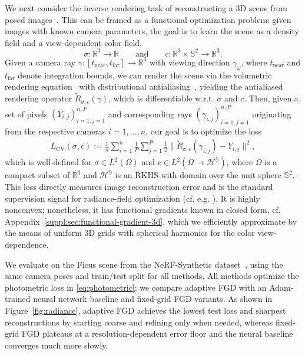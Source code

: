 \documentclass{article}
\newcommand{\R}{\mathbb{R}}
\newcommand{\near}{\mathrm{near}}
\newcommand{\far}{\mathrm{far}}
\begin{document}
We next consider the inverse rendering task of reconstructing a 3D scene from posed images~\citep{mildenhall2021nerf}.
This can be framed as a functional optimization problem: given images with known camera parameters, the goal is to learn the scene as a density field and a view-dependent color field,
\[
    \sigma : \R^3 \to \R
    \qquad\text{and}\qquad
    c : \R^3 \times \mathbb{S}^2 \to \R^3.
\]
Given a camera ray $\gamma : [t_\near,t_\far]\to\R^3$ with viewing direction $\gamma_\omega$, where $t_\near$ and $t_\far$ denote integration bounds, we can render the scene via the volumetric rendering equation~\citep{max1995optical} with distributional antialiasing~\citep{cook1984distributed}, yielding the antialiased rendering operator $\widetilde{R}_{\sigma,c}(\gamma)$, which is differentiable w.r.t. $\sigma$ and $c$.
Then, given a set of pixels $(Y_{i,j})_{i=1,j=1}^{n,P}$ and corresponding rays $(\gamma_{i,j})_{i=1,j=1}^{n,P}$ originating from the respective cameras $i = 1, \ldots, n$, our goal is to optimize the loss
\begin{align}\label{eq:photometric}
  L_\mathrm{CV}(\sigma, c) := \frac{1}{n} \sum_{i=1}^n \frac{1}{P} \sum_{j=1}^P \frac{1}{2} \lVert \widetilde{R}_{\sigma,c}(\gamma_{i,j}) - Y_{i,j} \rVert^2,
\end{align}
which is well-defined for $\sigma \in L^2(\Omega)$ and $c \in L^2(\Omega \to \mathcal{H}^{\mathbb{S}})$, where $\Omega$ is a compact subset of $\R^3$ and $\mathcal{H}^\mathbb{S}$ is an RKHS with domain over the unit sphere $\mathbb{S}^2$.
This loss directly measures image reconstruction error and is the standard supervision signal for radiance-field optimization (cf. e.g. \citep{mildenhall2021nerf,kerbl20233d}).
It is highly nonconvex; nonetheless, it has functional gradients known in closed form, cf. Appendix~\ref{suppl:sec:functional-gradient-3d}, which we efficiently approximate by the means of uniform 3D grids with spherical harmonics for the color view-dependence.

We evaluate on the Ficus scene from the NeRF-Synthetic dataset~\citep{mildenhall2021nerf}, using the same camera poses and train/test split for all methods. All methods optimize the photometric loss in \eqref{eq:photometric}; we compare adaptive FGD with an Adam-trained neural network baseline and fixed-grid FGD variants. As shown in Figure~\ref{fig:radiance}, adaptive FGD achieves the lowest test loss and sharpest reconstructions by starting coarse and refining only when needed, whereas fixed-grid FGD plateaus at a resolution-dependent error floor and the neural baseline converges much more slowly.
\end{document}
